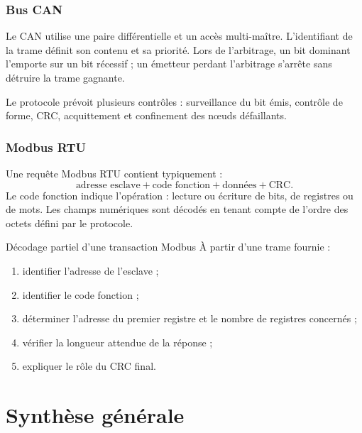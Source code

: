 \subsubsection{Bus CAN}

Le CAN utilise une paire différentielle et un accès multi-maître. L'identifiant de la trame définit son contenu et sa priorité. Lors de l'arbitrage, un bit dominant l'emporte sur un bit récessif ; un émetteur perdant l'arbitrage s'arrête sans détruire la trame gagnante.

Le protocole prévoit plusieurs contrôles : surveillance du bit émis, contrôle de forme, CRC, acquittement et confinement des nœuds défaillants.

\subsubsection{Modbus RTU}

Une requête Modbus RTU contient typiquement :
\[
\boxed{\text{adresse esclave} + \text{code fonction} + \text{données} + \text{CRC}.}
\]
Le code fonction indique l'opération : lecture ou écriture de bits, de registres ou de mots. Les champs numériques sont décodés en tenant compte de l'ordre des octets défini par le protocole.

\begin{TLLogicApplication}{Décodage partiel d'une transaction Modbus}
À partir d'une trame fournie :
\begin{enumerate}
  \item identifier l'adresse de l'esclave ;
  \item identifier le code fonction ;
  \item déterminer l'adresse du premier registre et le nombre de registres concernés ;
  \item vérifier la longueur attendue de la réponse ;
  \item expliquer le rôle du CRC final.
\end{enumerate}
\end{TLLogicApplication}

\section{Synthèse générale}
\label{sec:logique-synthese}

